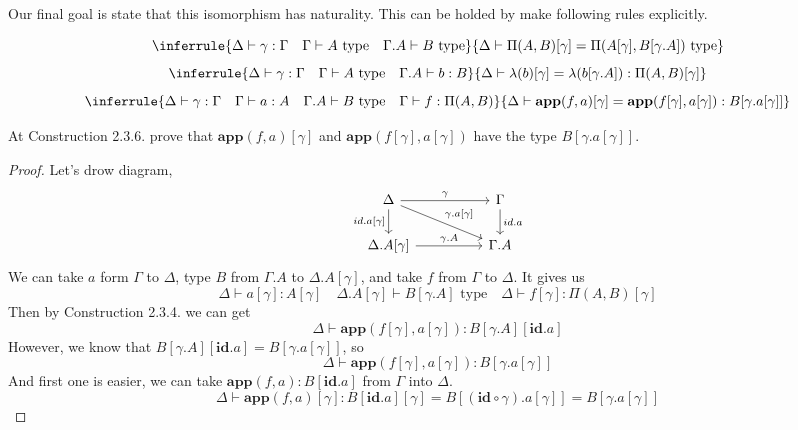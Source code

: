 \documentclass[12pt, a4paper, openany, twoside]{book}
\theoremstyle{definition}
\theoremstyle{remark}
\theoremstyle{plain}
\numberwithin{equation}{section}
\begin{document}
Our final goal is state that this isomorphism has naturality. This can be holded by make following rules explicitly. 

\begin{tcolorbox}[colback=yellow!10!white,colframe=green!75!black,title=Construction 2.3.6.]
\[
\inferrule
{
    \Delta \vdash \gamma : \Gamma \quad \Gamma \vdash A \text{ type} \quad \Gamma.A \vdash B \text{ type}
}
{
    \Delta \vdash \Pi(A, B)[\gamma] = \Pi(A[\gamma], B[\gamma.A]) \text{ type}
}
\]
\[
\inferrule
{
    \Delta \vdash \gamma : \Gamma \quad \Gamma \vdash A \text{ type} \quad \Gamma.A \vdash b : B
}
{
    \Delta \vdash \lambda(b)[\gamma] = \lambda(b[\gamma.A]) : \Pi(A, B)[\gamma]
}
\]
\[
\inferrule
{
    \Delta \vdash \gamma : \Gamma \quad \Gamma \vdash a : A \quad \Gamma.A \vdash B \text{ type} \quad \Gamma \vdash f : \Pi(A, B) 
}
{
    \Delta \vdash \textbf{app}(f, a)[\gamma] = \textbf{app}(f[\gamma], a[\gamma]) : B[\gamma.a[\gamma]]
}
\]
\end{tcolorbox}

\begin{tcolorbox}[breakable, colback=yellow!10!white,colframe=brown!75!black,title=Exercise 2.6.]
At Construction 2.3.6. prove that $\textbf{app}(f, a)[\gamma]$ and $\textbf{app}(f[\gamma], a[\gamma])$ have the type $B[\gamma.a[\gamma]]$. 

\begin{proof}
    Let's drow diagram, 
    \[
    \begin{tikzcd}[column sep = huge]
        \Delta \arrow[r, "\gamma"] \arrow[rd, "{\gamma.a[\gamma]}"] \arrow[d, "{id.a[\gamma]}"'] & \Gamma \arrow[d, "id.a"] \\
        \Delta.A[\gamma] \arrow[r, "\gamma.A"] & \Gamma.A
    \end{tikzcd}
    \]
    We can take $a$ form $\Gamma$ to $\Delta$, type $B$ from $\Gamma.A$ to $\Delta.A[\gamma]$, and take $f$ from $\Gamma$ to $\Delta$. It gives us 
    \[\Delta \vdash a[\gamma] : A[\gamma] \quad \Delta.A[\gamma] \vdash B[\gamma.A] \text{ type} \quad \Delta \vdash f[\gamma] : \Pi(A, B)[\gamma]\]
    Then by Construction 2.3.4. we can get 
    \[\Delta \vdash \textbf{app}(f[\gamma], a[\gamma]) : B[\gamma.A][\textbf{id}.a]\]
    However, we know that $B[\gamma.A][\textbf{id}.a] = B[\gamma.a[\gamma]]$, so 
    \[\Delta \vdash \textbf{app}(f[\gamma], a[\gamma]) : B[\gamma.a[\gamma]]\]
    And first one is easier, we can take $\textbf{app}(f, a) : B[\textbf{id}.a]$ from $\Gamma$ into $\Delta$. 
    \[\Delta \vdash \textbf{app}(f, a)[\gamma] : B[\textbf{id}.a][\gamma] = B[(\textbf{id}\circ \gamma).a[\gamma]] = B[\gamma.a[\gamma]]\]
\end{proof}

\end{tcolorbox}
\end{document}
